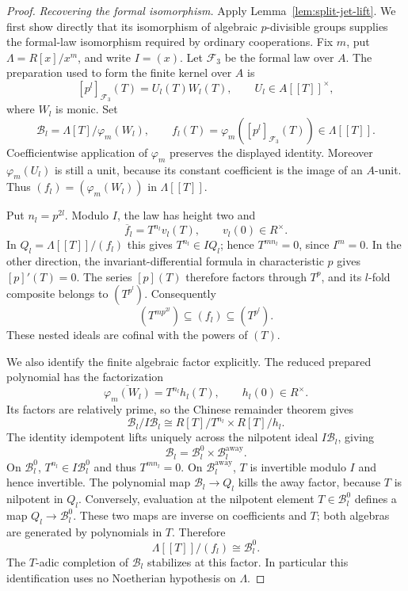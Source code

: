 \begin{proof}
\emph{Recovering the formal isomorphism.}
Apply Lemma~\ref{lem:split-jet-lift}.  We first show directly that
its isomorphism of algebraic $p$-divisible groups supplies the
formal-law isomorphism required by ordinary cooperations.
Fix $m$, put $\Lambda=R[x]/x^m$, and write $I=(x)$.
Let $\mathcal F_3$ be the formal law over $A$.  The preparation used to form
the finite kernel over $A$ is
\[
 [p^l]_{\mathcal F_3}(T)=U_l(T)W_l(T),\qquad U_l\in A[[T]]^\times,
\]
where $W_l$ is monic.  Set
\[
 \mathcal B_l=\Lambda[T]/\varphi_m(W_l),\qquad
 f_l(T)=\varphi_m([p^l]_{\mathcal F_3}(T))\in\Lambda[[T]].
\]
Coefficientwise application of $\varphi_m$ preserves the displayed
identity.  Moreover $\varphi_m(U_l)$ is still a unit, because its
constant coefficient is the image of an $A$-unit.  Thus
$(f_l)=(\varphi_m(W_l))$ in $\Lambda[[T]]$.

Put $n_l=p^{2l}$.  Modulo $I$, the law has height two and
\[
              \overline f_l=T^{n_l}v_l(T),
                  \qquad v_l(0)\in R^\times.
\]
In $Q_l=\Lambda[[T]]/(f_l)$ this gives $T^{n_l}\in IQ_l$;
hence $T^{mn_l}=0$, since $I^m=0$.  In the other direction,
the invariant-differential formula in characteristic $p$ gives
$[p]'(T)=0$.  The series $[p](T)$ therefore factors through
$T^p$, and its $l$-fold composite belongs to $(T^{p^l})$.
Consequently
\begin{equation}\label{eq:torsion-coordinate-bounds}
        (T^{mp^{2l}})\subseteq(f_l)\subseteq(T^{p^l}).
\end{equation}
These nested ideals are cofinal with the powers of $(T)$.

We also identify the finite algebraic factor explicitly.  The
reduced prepared polynomial has the factorization
\[
 \overline{\varphi_m(W_l)}=T^{n_l}h_l(T),
                  \qquad h_l(0)\in R^\times.
\]
Its factors are relatively prime, so the Chinese remainder theorem
gives
\[
 \mathcal B_l/I\mathcal B_l
       \cong R[T]/T^{n_l}\times R[T]/h_l.
\]
The identity idempotent lifts uniquely across the nilpotent ideal
$I\mathcal B_l$, giving
\[
          \mathcal B_l=\mathcal B_l^0
                         \times\mathcal B_l^{\mathrm{away}}.
\]
On $\mathcal B_l^0$, $T^{n_l}\in I\mathcal B_l^0$ and thus
$T^{mn_l}=0$.  On $\mathcal B_l^{\mathrm{away}}$, $T$ is
invertible modulo $I$ and hence invertible.  The polynomial map
$\mathcal B_l\to Q_l$ kills the away factor, because $T$ is
nilpotent in $Q_l$.  Conversely, evaluation at the nilpotent
element $T\in\mathcal B_l^0$ defines a map
$Q_l\to\mathcal B_l^0$.  These two maps are inverse on coefficients
and $T$; both algebras are generated by polynomials in $T$.
Therefore
\[
       \Lambda[[T]]/(f_l)\cong\mathcal B_l^0.
\]
The $T$-adic completion of $\mathcal B_l$ stabilizes at this factor.
In particular this identification uses no Noetherian hypothesis on
$\Lambda$.


\end{proof}
